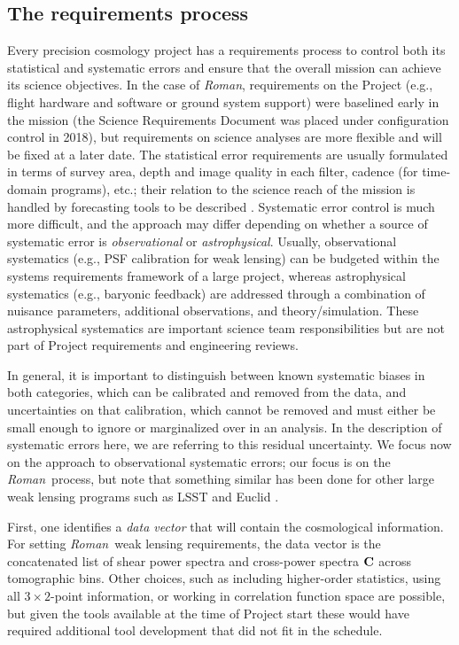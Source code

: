 \documentclass[usenatbib]{mnras}
\newcommand{\wfirst}{{\slshape Roman}}
\newcommand{\changetext}[1]{\textcolor{red}{#1}}
\begin{document}
\subsection{The requirements process}
\label{ss:req}

Every precision cosmology project has a requirements process to control both its statistical and systematic errors and ensure that the overall mission can achieve its science objectives. In the case of \wfirst, requirements on the Project (e.g., flight hardware and software or ground system support) were baselined early in the mission (the Science Requirements Document was placed under configuration control in 2018), but requirements on science analyses are more flexible and will be fixed at a later date. The statistical error requirements are usually formulated in terms of survey area, depth and image quality in each filter, cadence (for time-domain programs), etc.; their relation to the science reach of the mission is handled by forecasting tools to be described \changetext{\citep{2020arXiv200404702E, 2020arXiv200405271E}}. Systematic error control is much more difficult, and the approach may differ depending on whether a source of systematic error is {\em observational} or {\em astrophysical}. Usually, observational systematics (e.g., PSF calibration for weak lensing) can be budgeted within the systems requirements framework of a large project, whereas astrophysical systematics (e.g., baryonic feedback) are addressed through a combination of nuisance parameters, additional observations, and theory/simulation. These astrophysical systematics are important science team responsibilities but are not part of Project requirements and engineering reviews.

In general, it is important to distinguish between known systematic biases in both categories, which can be calibrated and removed from the data, and uncertainties on that calibration, which cannot be removed and must either be small enough to ignore or marginalized over in an analysis. In the description of systematic errors here, we are referring to this residual uncertainty. We focus now on the approach to observational systematic errors; our focus is on the \wfirst\ process, but note that something similar has been done for other large weak lensing programs such as LSST and Euclid \citep{euclid_srd,2016SPIE.9911E..05V,LPM-17,2018arXiv180901669T,LSE-29}.

First, one identifies a {\em data vector} that will contain the cosmological information. For setting \wfirst\ weak lensing requirements, the data vector is the concatenated list of shear power spectra and cross-power spectra ${\bf C}$ across tomographic bins. Other choices, such as including higher-order statistics, using all $3\times 2$-point information, or working in correlation function space are possible, but given the tools available at the time of Project start these would have required additional tool development that did not fit in the schedule.
\end{document}

